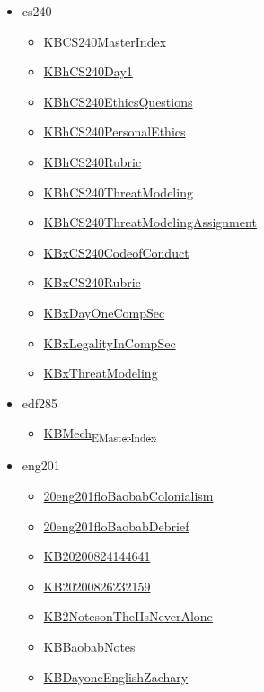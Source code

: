 \documentclass[11pt]{article}
\begin{document}
\begin{itemize}
\begin{itemize}
\end{itemize}
\item cs240
\begin{itemize}
\item \href{cs240/KBCS240MasterIndex.org}{KBCS240MasterIndex}
\item \href{cs240/KBhCS240Day1.org}{KBhCS240Day1}
\item \href{cs240/KBhCS240EthicsQuestions.org}{KBhCS240EthicsQuestions}
\item \href{cs240/KBhCS240PersonalEthics.org}{KBhCS240PersonalEthics}
\item \href{cs240/KBhCS240Rubric.org}{KBhCS240Rubric}
\item \href{cs240/KBhCS240ThreatModeling.org}{KBhCS240ThreatModeling}
\item \href{cs240/KBhCS240ThreatModelingAssignment.org}{KBhCS240ThreatModelingAssignment}
\item \href{cs240/KBxCS240CodeofConduct.org}{KBxCS240CodeofConduct}
\item \href{cs240/KBxCS240Rubric.org}{KBxCS240Rubric}
\item \href{cs240/KBxDayOneCompSec.org}{KBxDayOneCompSec}
\item \href{cs240/KBxLegalityInCompSec.org}{KBxLegalityInCompSec}
\item \href{cs240/KBxThreatModeling.org}{KBxThreatModeling}
\end{itemize}
\item edf285
\begin{itemize}
\item \href{edf285/KBMech\_E\_Master\_Index.org}{KBMech\textsubscript{E}\textsubscript{Master}\textsubscript{Index}}
\end{itemize}
\item eng201
\begin{itemize}
\item \href{eng201/20eng201floBaobabColonialism.org}{20eng201floBaobabColonialism}
\item \href{eng201/20eng201floBaobabDebrief.org}{20eng201floBaobabDebrief}
\item \href{eng201/KB20200824144641.org}{KB20200824144641}
\item \href{eng201/KB20200826232159.org}{KB20200826232159}
\item \href{eng201/KB2NotesonTheIIsNeverAlone.org}{KB2NotesonTheIIsNeverAlone}
\item \href{eng201/KBBaobabNotes.org}{KBBaobabNotes}
\item \href{eng201/KBDayoneEnglishZachary.org}{KBDayoneEnglishZachary}

\end{itemize}
\end{itemize}
\end{document}
